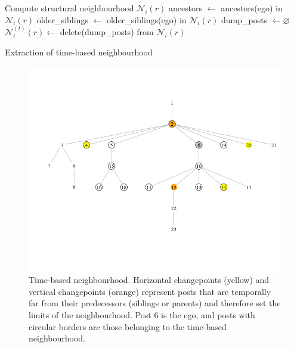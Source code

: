 \documentclass[9pt,technote]{IEEEtran}
\begin{document}
\begin{algorithm}
 Compute structural neighbourhood $\mathcal{N}_i(r)$\;
 ancestors $\leftarrow$  ancestors(ego) in $\mathcal{N}_i(r)$\;
 older\_siblings $\leftarrow$ older\_siblings(ego) in $\mathcal{N}_i(r)$\;
 dump\_posts $\leftarrow \varnothing$\;
 $\mathcal{N}_i^{(t)}(r) \leftarrow$ delete(dump\_posts) from $\mathcal{N}_i(r)$\;
 \caption{Extraction of time-based neighbourhood}
 \label{alg:temporal_neighbourhood}
\end{algorithm}
 
\begin{figure}
\centering
\includegraphics[width=1\textwidth]{breakpoints}
\caption{Time-based neighbourhood. Horizontal changepoints (yellow) and vertical changepoints (orange) represent posts that are temporally far from their predecessors (siblings or parents) and therefore set the limits of the neighbourhood. Post 6 is the ego, and posts with circular borders are those belonging to the time-based neighbourhood.}
\label{fig:cutpoints}
\end{figure}
\end{document}
